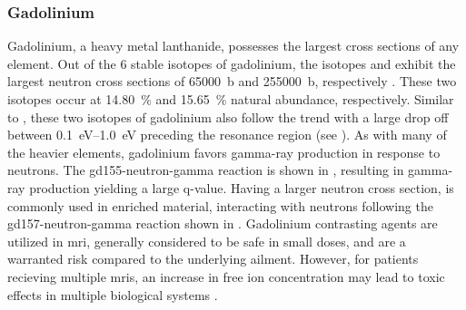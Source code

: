 \documentclass[../../../../main.tex]{subfiles}
\begin{document}
%
    \subsubsection{Gadolinium}%
    \label{sec:chapter-2:radiation-detection:neutron-interactions:gadolinium}%
    Gadolinium, a heavy metal lanthanide, possesses the largest cross sections of any element.
    Out of the 6 stable isotopes of gadolinium, the isotopes  and  exhibit the largest neutron cross sections of \SI{65000}{\barn} and \SI{255000}{\barn}, respectively \cite{Chadwick_2011}. 
    These two isotopes occur at \SI{14.80}{\percent} and \SI{15.65}{\percent} natural abundance, respectively.
    Similar to , these two isotopes of gadolinium also follow the  trend with a large drop off between \SIrange{0.1}{1.0}{\electronvolt} preceding the resonance region (see ).
    As with many of the heavier elements, gadolinium favors \gls{gamma-ray} production in response to neutrons.
    The \gls{gd155-neutron-gamma} reaction is shown in , resulting in \gls{gamma-ray} production yielding a large \gls{q-value}.%
    Having a larger neutron cross section,  is commonly used in enriched material, interacting with neutrons following the \gls{gd157-neutron-gamma} reaction shown in .%
    Gadolinium contrasting agents are utilized in \gls{mri}, generally considered to be safe in small doses, and are a warranted risk compared to the underlying ailment.
    However, for patients recieving multiple \glspl{mri}, an increase in free  ion concentration may lead to toxic effects in multiple biological systems \cite{Semelka_2016,Rogosnitzky_2016}.
\end{document}
